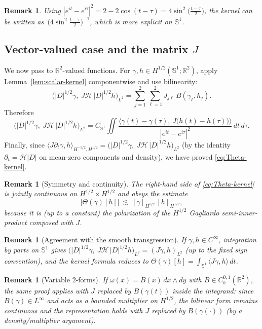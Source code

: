 \documentclass{amsart}
\newcounter{thm}
\newcounter{ex}
\newcounter{re}
\newtheorem{remark}[thm]{Remark}
\begin{document}
\begin{remark}
Using $|e^{it}-e^{i\tau}|^{2}=2-2\cos(t-\tau)=4\sin^2\!\big(\tfrac{t-\tau}{2}\big)$, the kernel can be written as
$\,\big(4\sin^2\!\tfrac{t-\tau}{2}\big)^{-1}$, which is more explicit on $\mathbb S^1$.
\end{remark}

\subsection{Vector-valued case and the matrix $J$}

We now pass to $\mathbb R^2$-valued functions. For $\gamma,h\in H^{1/2}(\mathbb S^1;\mathbb R^2)$,
apply Lemma~\ref{lem:scalar-kernel} componentwise and use bilinearity:
\[
\big(|D|^{1/2}\gamma,\ J\mathcal H\,|D|^{1/2}h\big)_{L^2}
=\sum_{j=1}^2\sum_{\ell=1}^2 J_{j\ell}\,B(\gamma_\ell,h_j).
\]
Therefore
\[
\big(|D|^{1/2}\gamma,\ J\mathcal H\,|D|^{1/2}h\big)_{L^2}
=C_{\mathbb S^1}
\iint\frac{\big\langle \gamma(t)-\gamma(\tau),\,J\big(h(t)-h(\tau)\big)\big\rangle}{|e^{it}-e^{i\tau}|^{2}}\,dt\,d\tau.
\]
Finally, since $\langle J\partial_t\gamma,h\rangle_{H^{-1/2},H^{1/2}}
=\big(|D|^{1/2}\gamma,\ J\mathcal H\,|D|^{1/2}h\big)_{L^2}$ (by the identity $\partial_t=\mathcal H|D|$ on mean-zero components and density),
we have proved \eqref{eq:Theta-kernel}.

\begin{remark}[Symmetry and continuity]
The right-hand side of \eqref{eq:Theta-kernel} is jointly continuous on $H^{1/2}\times H^{1/2}$ and
obeys the estimate
\[
|\Theta(\gamma)[h]|\ \lesssim\ [\gamma]_{H^{1/2}}\,[h]_{H^{1/2}},
\]
because it is (up to a constant) the polarization of the $H^{1/2}$ Gagliardo semi-inner-product composed with $J$.
\end{remark}

\begin{remark}[Agreement with the smooth transgression]
If $\gamma,h\in C^\infty$, integration by parts on $\mathbb S^1$ gives
$\big(|D|^{1/2}\gamma,\ J\mathcal H\,|D|^{1/2}h\big)_{L^2}
=(J\dot\gamma,h)_{L^2}$ (up to the fixed sign convention), and the kernel formula reduces to
$\Theta(\gamma)[h]=\int_{\mathbb S^1}\langle J\dot\gamma,h\rangle\,dt$.
\end{remark}

\begin{remark}[Variable 2-forms]
If $\omega(x)=B(x)\,dx\wedge dy$ with $B\in C^{0,1}_b(\mathbb R^2)$, the same proof applies with $J$ replaced by $B(\gamma(t))$ inside the integrand: since $B(\gamma)\in L^\infty$ and acts as a bounded multiplier on $H^{1/2}$, the bilinear form remains continuous and the representation holds with $J$ replaced by $B(\gamma(\cdot))$ (by a density/multiplier argument).
\end{remark}
\end{document}
